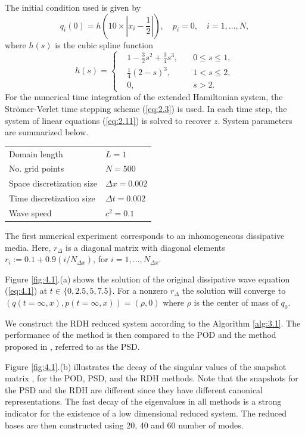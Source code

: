The initial condition used is given by
\begin{equation} \label{eq:4.5}
	q_i(0) = h( 10\times|x_i - \frac{1}{2}| ), \quad p_i = 0, \quad i=1,\dots,N,
\end{equation}
where $h(s)$ is the cubic spline function
\begin{equation} \label{eq:4.6}
h(s) = 
\left\{
\begin{aligned}
& 1 - \frac{3}{2}s^2 + \frac{3}{4}s^3, \quad & 0\leq s \leq 1, \\
& \frac{1}{4}(2-s)^3, & 1< s \leq 2, \\
& 0, & s > 2.
\end{aligned}
\right.
\end{equation}
For the numerical time integration of the extended Hamiltonian system, the Str\"omer-Verlet time stepping scheme (\ref{eq:2.3}) is used. In each time step, the system of linear equations (\ref{eq:2.11}) is solved to recover $z$. System parameters are summarized below.
\vspace{0.5cm}
\begin{center}
\begin{tabular}{|l|l|}
\hline
Domain length & $L = 1$ \\
No. grid points & $N = 500$ \\
Space discretization size & $\Delta x = 0.002$ \\
Time discretization size & $\Delta t = 0.002$ \\
Wave speed & $c^2 = 0.1$ \\
\hline
\end{tabular}
\end{center}
\vspace{0.5cm}
The first numerical experiment corresponds to an inhomogeneous dissipative media. Here, $r_{\Delta}$ is a diagonal matrix with diagonal elements $r_i := 0.1 + 0.9(i/N_{\Delta x})$, for $i=1,\dots,N_{\Delta x}$.

Figure \ref{fig:4.1}.(a) shows the solution of the original dissipative wave equation (\ref{eq:4.1}) at $t \in \{0,2.5,5,7.5\}$. For a nonzero $r_\Delta$ the solution will converge to $(q(t=\infty,x),p(t=\infty,x)) = (\rho,0)$ where $\rho$ is the center of mass of $q_0$. 

We construct the RDH reduced system according to the Algorithm \ref{alg:3.1}. The performance of the method is then compared to the POD and the method proposed in \cite{peng2016geometric}, referred to as the PSD.

Figure \ref{fig:4.1}.(b) illustrates the decay of the singular values of the snapshot matrix \cite{hesthaven2015certified}, for the POD, PSD, and the RDH methods. Note that the snapshots for the PSD and the RDH are different since they have different canonical representations. The fast decay of the eigenvalues in all methods is a strong indicator for the existence of a low dimensional reduced system. The reduced bases are then constructed using 20, 40 and 60 number of modes.

